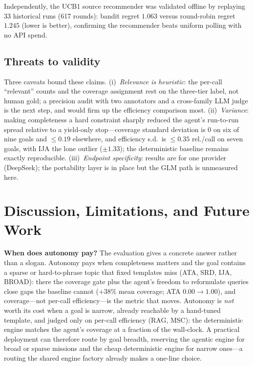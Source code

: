 \documentclass[conference]{IEEEtran}
\begin{document}
Independently, the UCB1 source recommender was validated offline by replaying 33 historical runs (617 rounds): bandit regret $1.063$ versus round-robin regret $1.245$ (lower is better), confirming the recommender beats uniform polling with no API spend.

\subsection{Threats to validity}

Three caveats bound these claims. (i)~\emph{Relevance is heuristic}: the per-call ``relevant'' counts and the coverage assignment rest on the three-tier label, not human gold; a precision audit with two annotators and a cross-family LLM judge is the next step, and would firm up the efficiency comparison most. (ii)~\emph{Variance}: making completeness a hard constraint sharply reduced the agent's run-to-run spread relative to a yield-only stop---coverage standard deviation is $0$ on six of nine goals and $\le 0.19$ elsewhere, and efficiency s.d.\ is $\le 0.35$ rel./call on seven goals, with IJA the lone outlier ($\pm 1.33$); the deterministic baseline remains exactly reproducible. (iii)~\emph{Endpoint specificity}: results are for one provider (DeepSeek); the portability layer is in place but the GLM path is unmeasured here.

\section{Discussion, Limitations, and Future Work}

\textbf{When does autonomy pay?} The evaluation gives a concrete answer rather than a slogan. Autonomy pays when completeness matters and the goal contains a sparse or hard-to-phrase topic that fixed templates miss (ATA, SRD, IJA, BROAD): there the coverage gate plus the agent's freedom to reformulate queries close gaps the baseline cannot ($+38\%$ mean coverage; ATA $0.00\!\to\!1.00$), and coverage---not per-call efficiency---is the metric that moves. Autonomy is \emph{not} worth its cost when a goal is narrow, already reachable by a hand-tuned template, and judged only on per-call efficiency (RAG, MSC): the deterministic engine matches the agent's coverage at a fraction of the wall-clock. A practical deployment can therefore route by goal breadth, reserving the agentic engine for broad or sparse missions and the cheap deterministic engine for narrow ones---a routing the shared engine factory already makes a one-line choice.
\end{document}
